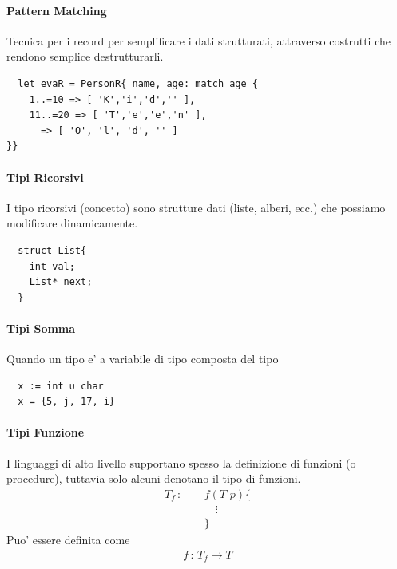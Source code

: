 \documentclass[a4paper,12pt]{article}
\begin{document}
\paragraph{Pattern Matching}
Tecnica per i record per semplificare i dati strutturati, attraverso costrutti che rendono semplice destrutturarli.
\begin{lstlisting}
  let evaR = PersonR{ name, age: match age {
    1..=10 => [ 'K','i','d','' ],
    11..=20 => [ 'T','e','e','n' ],
    _ => [ 'O', 'l', 'd', '' ]
}}
\end{lstlisting}
\paragraph{Tipi Ricorsivi}
I tipo ricorsivi (concetto) sono strutture dati (liste, alberi, ecc.) che possiamo modificare dinamicamente.
\begin{lstlisting}
  struct List{
    int val;
    List* next;
  }
\end{lstlisting} 
\paragraph{Tipi Somma}
Quando un tipo e' a variabile di tipo composta del tipo
\begin{lstlisting}
  x := int ∪ char
  x = {5, j, 17, i}
\end{lstlisting}
\paragraph{Tipi Funzione}
I linguaggi di alto livello supportano spesso la definizione di funzioni (o procedure), tuttavia solo alcuni denotano il tipo di funzioni.
\begin{align*}
  T_f \, : \, \quad & f(T \, \, p)\{\\
    & \quad \vdots \\
    & \}
\end{align*}
Puo' essere definita come 
\begin{align*}
  f \, : \, T_f \to T
\end{align*}
\end{document}

